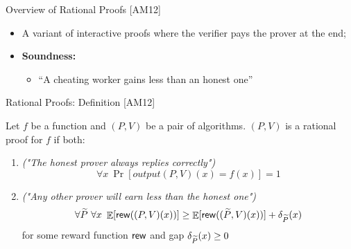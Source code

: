 \begin{frame}{Overview of Rational Proofs [AM12]}
\begin{itemize}[<+- | alert@+>]
	\item A variant of interactive proofs where the verifier pays the prover at the end;
	\item \textbf{Soundness:}
	\begin{itemize}
		\item ``A cheating worker gains less than an honest one''
	\end{itemize}
\end{itemize}
\end{frame}


\begin{frame}{Rational Proofs: Definition [AM12]}
		\begin{framed}
			Let $f$ be a function and $(P,V)$ be a pair of algorithms. $(P,V)$ is a rational proof for $f$ if both:
			\onslide<+->
			\begin{enumerate}[<+- | alert@+>]
				\item \emph{("The honest prover always replies correctly")} 
				$$ \forall x\  \Pr[output(P,V)(x) = f(x) ] = 1$$
				\item \emph{("Any other prover will earn less than the honest one")}
				$$ \forall \widetilde{P} \ \forall x \  \mathop{\mathbb{E}}[\mathsf{rew}((P,V)(x))] \geq \mathop{\mathbb{E}}[\mathsf{rew}((\widetilde{P},V)(x))] + \delta_{\widetilde{P}}(x)  $$
				for some reward function $\mathsf{rew}$ and gap $\delta_{\widetilde{P}}(x) \geq 0$
			\end{enumerate}
		\end{framed}
		
\end{frame}